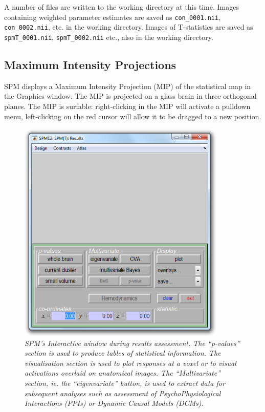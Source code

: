 A number of files are written to the working directory at this time.
Images containing weighted parameter estimates are saved as \texttt{con\_0001.nii}, \texttt{con\_0002.nii}, etc. in the working directory. Images of T-statistics are saved as \texttt{spmT\_0001.nii}, \texttt{spmT\_0002.nii} etc., also in the working directory.

\subsection{Maximum Intensity Projections}

SPM displays a Maximum Intensity Projection (MIP) of the statistical map in the Graphics window. The MIP is projected on a glass brain in three orthogonal planes. The MIP is surfable: right-clicking in the MIP will activate a pulldown menu, left-clicking  on the red cursor will allow it to be dragged to a new position.

\begin{figure}
\begin{center}
\includegraphics[width=100mm]{auditory/interactive}
\caption{\em SPM's Interactive window during results assessment. The ``\textit{p}-values'' section is used to produce tables of statistical information. The visualisation section is used to plot responses at a voxel or to visual activations overlaid on anatomical images. The ``Multivariate'' section, ie. the ``eigenvariate'' button, is used to extract data for subsequent analyses such as assessment of PsychoPhysiological Interactions (PPIs) or Dynamic  Causal Models (DCMs).}
\end{center}
\end{figure}

